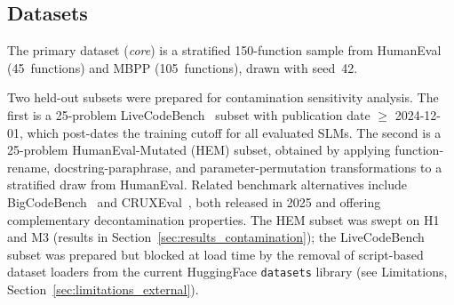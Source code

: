 \subsection{Datasets}
\label{sec:experiment_setup_datasets}

The primary dataset (\emph{core}) is a stratified 150-function sample from HumanEval (45~functions) and MBPP (105~functions), drawn with seed~42.

Two held-out subsets were prepared for contamination sensitivity analysis. The first is a 25-problem LiveCodeBench~\citep{Jain2025LiveCodeBench} subset with publication date $\geq$ 2024-12-01, which post-dates the training cutoff for all evaluated SLMs. The second is a 25-problem HumanEval-Mutated (HEM) subset, obtained by applying function-rename, docstring-paraphrase, and parameter-permutation transformations to a stratified draw from HumanEval. Related benchmark alternatives include BigCodeBench~\citep{Zhuo2025BigCodeBench} and CRUXEval~\citep{Gu2025CruxEval}, both released in 2025 and offering complementary decontamination properties. The HEM subset was swept on H1 and M3 (results in Section~\ref{sec:results_contamination}); the LiveCodeBench subset was prepared but blocked at load time by the removal of script-based dataset loaders from the current HuggingFace \texttt{datasets} library (see Limitations, Section~\ref{sec:limitations_external}).

